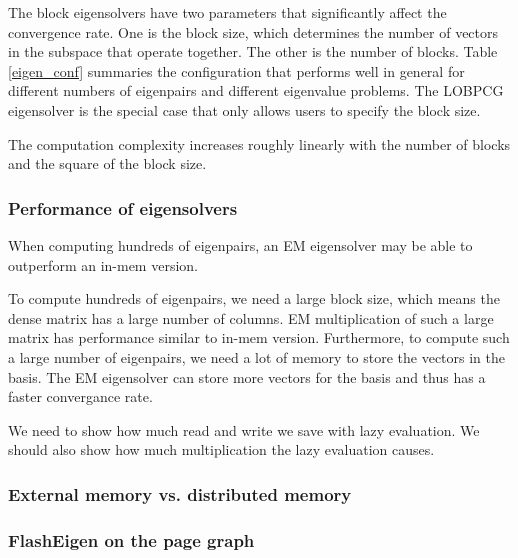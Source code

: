 The block eigensolvers have two parameters that significantly affect
the convergence rate. One is the block size, which determines the number
of vectors in the subspace that operate together. The other is the number
of blocks. Table \ref{eigen_conf} summaries the configuration that performs
well in general for different numbers of eigenpairs and different eigenvalue
problems. The LOBPCG eigensolver is the special case that only allows users
to specify the block size.

The computation complexity increases roughly linearly with the number of blocks
and the square of the block size.

\subsubsection{Performance of eigensolvers}

When computing hundreds of eigenpairs, an EM eigensolver may be able to outperform
an in-mem version.

To compute hundreds of eigenpairs, we need a large block size, which means
the dense matrix has a large number of columns. EM multiplication of such
a large matrix has performance similar to in-mem version. Furthermore,
to compute such a large number of eigenpairs, we need a lot of memory to
store the vectors in the basis. The EM eigensolver can store more vectors
for the basis and thus has a faster convergance rate.

We need to show how much read and write we save with lazy evaluation. We should
also show how much multiplication the lazy evaluation causes.




\subsubsection{External memory vs. distributed memory}

\subsubsection{FlashEigen on the page graph}
